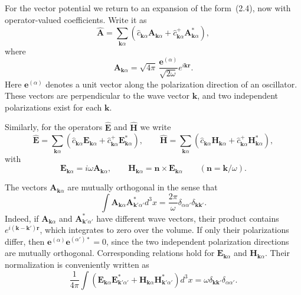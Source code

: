 For the vector potential we return to an expansion of the form~(2.4), now with operator-valued coefficients. Write it as
\begin{equation}
\widehat{\mathbf{A}}=\sum_{\mathbf{k}\alpha}\left(\widehat{c}_{\mathbf{k}\alpha}\mathbf{A}_{\mathbf{k}\alpha}+\widehat{c}_{\mathbf{k}\alpha}^{+}\mathbf{A}_{\mathbf{k}\alpha}^*\right),
\tag{2.17}
\end{equation}
where
\begin{equation}
\mathbf{A}_{\mathbf{k}\alpha}=\sqrt{4\pi}\,\frac{\mathbf{e}^{(\alpha)}}{\sqrt{2\omega}}e^{i\mathbf{kr}}.
\tag{2.18}
\end{equation}
Here $\mathbf{e}^{(\alpha)}$ denotes a unit vector along the polarization direction of an oscillator. These vectors are perpendicular to the wave vector $\mathbf{k}$, and two independent polarizations exist for each $\mathbf{k}$.

Similarly, for the operators $\widehat{\mathbf{E}}$ and $\widehat{\mathbf{H}}$ we write
\begin{equation}
\widehat{\mathbf{E}}=\sum_{\mathbf{k}\alpha}\left(\widehat{c}_{\mathbf{k}\alpha}\mathbf{E}_{\mathbf{k}\alpha}+\widehat{c}_{\mathbf{k}\alpha}^{+}\mathbf{E}_{\mathbf{k}\alpha}^*\right),\qquad
\widehat{\mathbf{H}}=\sum_{\mathbf{k}\alpha}\left(\widehat{c}_{\mathbf{k}\alpha}\mathbf{H}_{\mathbf{k}\alpha}+\widehat{c}_{\mathbf{k}\alpha}^{+}\mathbf{H}_{\mathbf{k}\alpha}^*\right),
\tag{2.19}
\end{equation}
with
\begin{equation}
\mathbf{E}_{\mathbf{k}\alpha}=i\omega\mathbf{A}_{\mathbf{k}\alpha},\qquad
\mathbf{H}_{\mathbf{k}\alpha}=\mathbf{n}\times\mathbf{E}_{\mathbf{k}\alpha}\qquad(\mathbf{n}=\mathbf{k}/\omega).
\tag{2.20}
\end{equation}

The vectors $\mathbf{A}_{\mathbf{k}\alpha}$ are mutually orthogonal in the sense that
\begin{equation}
\int\mathbf{A}_{\mathbf{k}\alpha}\mathbf{A}_{\mathbf{k}'\alpha'}^*d^3x=\frac{2\pi}{\omega}\delta_{\alpha\alpha'}\delta_{\mathbf{k}\mathbf{k}'}.
\tag{2.21}
\end{equation}
Indeed, if $\mathbf{A}_{\mathbf{k}\alpha}$ and $\mathbf{A}_{\mathbf{k}'\alpha'}^*$ have different wave vectors, their product contains $e^{i(\mathbf{k}-\mathbf{k}')\mathbf{r}}$, which integrates to zero over the volume. If only their polarizations differ, then $\mathbf{e}^{(\alpha)}\mathbf{e}^{(\alpha')*}=0$, since the two independent polarization directions are mutually orthogonal. Corresponding relations hold for $\mathbf{E}_{\mathbf{k}\alpha}$ and $\mathbf{H}_{\mathbf{k}\alpha}$. Their normalization is conveniently written as
\begin{equation}
\frac{1}{4\pi}\int\left(\mathbf{E}_{\mathbf{k}\alpha}\mathbf{E}_{\mathbf{k}'\alpha'}^*+\mathbf{H}_{\mathbf{k}\alpha}\mathbf{H}_{\mathbf{k}'\alpha'}^*\right)d^3x=\omega\delta_{\mathbf{k}\mathbf{k}'}\delta_{\alpha\alpha'}.
\tag{2.22}
\end{equation}

